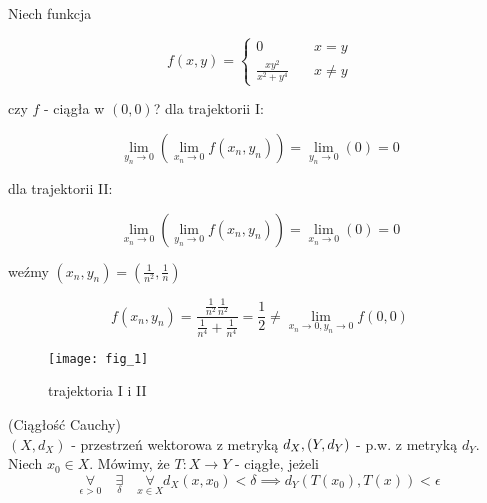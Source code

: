 \documentclass[../main.tex]{subfiles}
\begin{document}
\begin{przyklad}
    Niech funkcja

\[ f(x,y) =
\begin{cases}
    0                           & \quad x=y\\
    \frac{xy^2}{x^2+y^4}  & \quad x\neq y
\end{cases}
\]

czy $f$ - ciągła w $(0,0)$?
dla trajektorii I:

$$\lim\limits_{y_{n}\to 0}(\lim\limits_{x_{n}\rightarrow 0} f(x_{n},y_{n})) = \lim\limits_{y_{n}\rightarrow 0}(0) = 0$$

dla trajektorii II:

$$\lim\limits_{x_{n}\to 0}(\lim\limits_{y_{n}\rightarrow 0} f(x_{n},y_{n})) = \lim\limits_{x_{n}\rightarrow 0}(0) = 0$$

weźmy $(x_{n},y_{n}) = (\frac{1}{n^{2}},\frac{1}{n})$

$$f(x_{n},y_{n}) = \frac{\frac{1}{n^{2}} \frac{1}{n^{2}}}{\frac{1}{n^{4}}+\frac{1}{n^{4}}} = \frac{1}{2} \neq \lim\limits_{x_{n}\to 0, y_{n}\to 0} f(0,0)$$
\end{przyklad}

\begin{figure}
    \centering
    \begin{center}
        \texttt{[image: fig\_1]}
    \end{center}
    \caption{trajektoria I i II}
\end{figure}


\pagebreak
\begin{definicja}
    (Ciągłość Cauchy)\\
$(X,d_{X})$ - przestrzeń wektorowa z metryką $d_{X},\\ (Y,d_{Y})$ - p.w. z metryką $d_{Y}$.\\
Niech $x_{0}\in X$. Mówimy, że $T: X\to Y$ - ciągłe, jeżeli
$$\underset{\epsilon > 0}{\forall} \quad\underset{\delta}{\exists} \quad\underset{x\in X}{\forall} d_{X} (x,x_{0}) < \delta \implies d_{Y} (T(x_{0}), T(x)) < \epsilon$$
\end{definicja}
\end{document}
